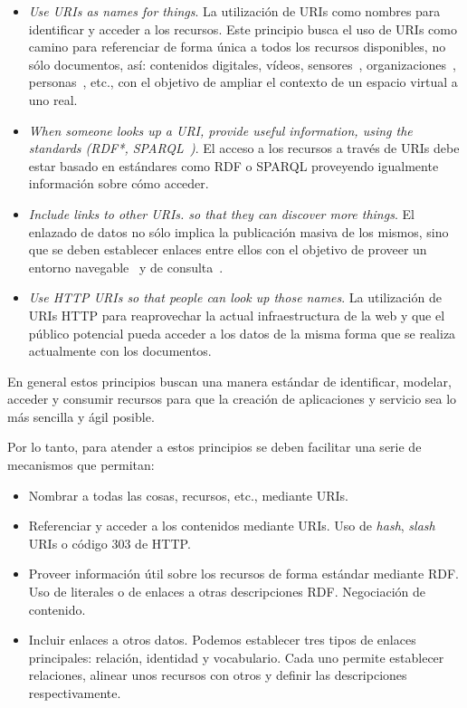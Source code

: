 \begin{itemize}
 \item \textit{Use \gls{URI}s as names for things}. La utilización de URIs como nombres para identificar y acceder a los recursos. Este principio busca el uso de URIs como camino para referenciar de forma única a todos
los recursos disponibles, no sólo documentos, así: contenidos digitales, vídeos, sensores~\cite{ontology-search,Jeung:2010:EMM:1850003.1850235}, 
  organizaciones~\cite{open-corporates}, personas~\cite{facebook-ld}, etc., con el objetivo de ampliar el contexto de un espacio virtual a uno real.
 \item \textit{When someone looks up a URI, provide useful information, using the standards (RDF*, SPARQL~\cite{Sparql})}. El acceso 
a los recursos a través de URIs debe estar basado en estándares como \gls{RDF} o \gls{SPARQL} proveyendo igualmente información
sobre cómo acceder.
\item \textit{Include links to other URIs. so that they can discover more things}. El enlazado de datos no sólo implica la publicación
masiva de los mismos, sino que se deben establecer enlaces entre ellos con el objetivo de proveer un entorno 
navegable~\cite{Berners-lee06tabulator:exploring,Pietriga06fresnel} y de consulta~\cite{Hartig09executingsparql}.
\item \textit{Use \gls{HTTP URI}s so that people can look up those names}. La utilización de URIs HTTP para reaprovechar la actual infraestructura
de la web y que el público potencial pueda acceder a los datos de la misma forma que se realiza actualmente con los documentos.
\end{itemize}

En general estos principios buscan una manera estándar de identificar, modelar, acceder y consumir recursos para que la creación
de aplicaciones y servicio sea lo más sencilla y ágil posible.

Por lo tanto, para atender a estos principios se deben facilitar una serie de mecanismos que permitan:
\begin{itemize}
 \item Nombrar a todas las cosas, recursos, etc., mediante URIs.
 \item Referenciar y acceder a los contenidos mediante URIs. Uso de \textit{hash}, \textit{slash} URIs o código $303$ de \gls{HTTP}. 
 \item Proveer información útil sobre los recursos de forma estándar mediante RDF. Uso de literales o de enlaces a otras
descripciones RDF. Negociación de contenido.
 \item Incluir enlaces a otros datos. Podemos establecer tres tipos de enlaces principales: relación, identidad y 
vocabulario. Cada uno permite establecer relaciones, alinear unos recursos con otros y definir las descripciones
respectivamente.
\end{itemize}

